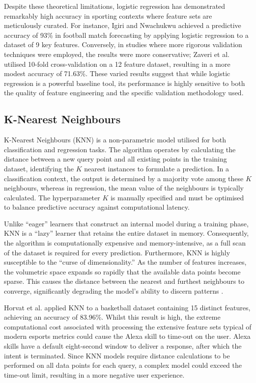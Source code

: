 Despite these theoretical limitations, logistic regression has demonstrated remarkably high accuracy in sporting contexts where feature sets are meticulously curated. For instance, Igiri and Nwachukwu \cite{igiri2014improved} achieved a predictive accuracy of 93\% in football match forecasting by applying logistic regression to a dataset of 9 key features. Conversely, in studies where more rigorous validation techniques were employed, the results were more conservative; Zaveri et al. \cite{zaveri2018prediction} utilised 10-fold cross-validation on a 12 feature dataset, resulting in a more modest accuracy of 71.63\%. These varied results suggest that while logistic regression is a powerful baseline tool, its performance is highly sensitive to both the quality of feature engineering and the specific validation methodology used.

\subsection*{K-Nearest Neighbours}
K-Nearest Neighbours (KNN) is a non-parametric model utilised for both classification and \gls{regression} tasks. The algorithm operates by calculating the distance between a new query point and all existing points in the training dataset, identifying the $K$ nearest instances to formulate a prediction. In a classification context, the output is determined by a majority vote among these $K$ neighbours, whereas in regression, the mean value of the neighbours is typically calculated. The hyperparameter $K$ is manually specified and must be optimised to balance predictive accuracy against computational latency.

Unlike ``eager'' learners that construct an internal model during a training phase, KNN is a ``lazy'' learner that retains the entire dataset in memory. Consequently, the algorithm is computationally expensive and memory-intensive, as a full scan of the dataset is required for every prediction. Furthermore, KNN is highly susceptible to the ``curse of dimensionality.'' As the number of features increases, the volumetric space expands so rapidly that the available data points become sparse. This causes the distance between the nearest and furthest neighbours to converge, significantly degrading the model's ability to discern patterns \cite{osisanwo2017supervised}.

Horvat et al. \cite{horvat2018prediction} applied KNN to a basketball dataset containing 15 distinct features, achieving an accuracy of 83.96\%. Whilst this result is high, the extreme computational cost associated with processing the extensive feature sets typical of modern esports metrics could cause the Alexa skill to time-out on the user. Alexa skills have a default eight-second window to deliver a response, after which the intent is terminated. Since KNN models require distance calculations to be performed on all data points for each query, a complex model could exceed the time-out limit, resulting in a more negative user experience.

